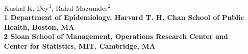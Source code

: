 \documentclass[10pt, a4paper]{article}
\begin{document}
\vspace*{0.35in}

\begin{flushleft}
{\Large
\textbf{}
}
\newline
Kushal K. Dey\textsuperscript{1},
Rahul Mazumder\textsuperscript{2}
\\
\bigskip
\bf{1} \small Department of Epidemiology, Harvard T. H. Chan School of Public Health, Boston, MA
\\
\bf{2} \small Sloan School of Management, Operations Research Center and Center for Statistics, MIT, Cambridge, MA
\end{flushleft}
\normalsize

\def\CorShrink{\texttt{CorShrink}}
\def\CorShrinkk{\texttt{CorShrink2}}
\def\Robocov{\texttt{Robocov}}
\def\Robospan{\texttt{Robospan}}
\def\pRobospan{\texttt{pRobospan}}
\def\Corspan{\texttt{Corspan}}

\justify











\linenumbers


\nolinenumbers




%
\end{document}
